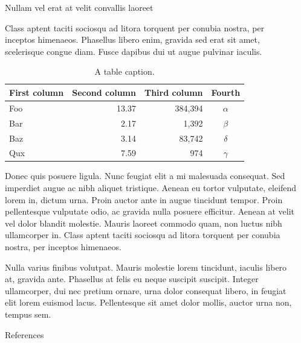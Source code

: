 \documentclass[final]{beamer}
\newlength{\sepwidth}
\newlength{\colwidth}
\newcommand{\separatorcolumn}{\begin{column}{\sepwidth}\end{column}}
\begin{document}
\begin{frame}[t]
\begin{columns}[t]
\begin{column}{\colwidth}
  \begin{block}{Nullam vel erat at velit convallis laoreet}

    Class aptent taciti sociosqu ad litora torquent per conubia nostra, per
    inceptos himenaeos. Phasellus libero enim, gravida sed erat sit amet,
    scelerisque congue diam. Fusce dapibus dui ut augue pulvinar iaculis.

    \begin{table}
      \centering
      \begin{tabular}{l r r c}
        \toprule
        \textbf{First column} & \textbf{Second column} & \textbf{Third column} & \textbf{Fourth} \\
        \midrule
        Foo & 13.37 & 384,394 & $\alpha$ \\
        Bar & 2.17 & 1,392 & $\beta$ \\
        Baz & 3.14 & 83,742 & $\delta$ \\
        Qux & 7.59 & 974 & $\gamma$ \\
        \bottomrule
      \end{tabular}
      \caption{A table caption.}
    \end{table}

    Donec quis posuere ligula. Nunc feugiat elit a mi malesuada consequat. Sed
    imperdiet augue ac nibh aliquet tristique. Aenean eu tortor vulputate,
    eleifend lorem in, dictum urna. Proin auctor ante in augue tincidunt
    tempor. Proin pellentesque vulputate odio, ac gravida nulla posuere
    efficitur. Aenean at velit vel dolor blandit molestie. Mauris laoreet
    commodo quam, non luctus nibh ullamcorper in. Class aptent taciti sociosqu
    ad litora torquent per conubia nostra, per inceptos himenaeos.

    Nulla varius finibus volutpat. Mauris molestie lorem tincidunt, iaculis
    libero at, gravida ante. Phasellus at felis eu neque suscipit suscipit.
    Integer ullamcorper, dui nec pretium ornare, urna dolor consequat libero,
    in feugiat elit lorem euismod lacus. Pellentesque sit amet dolor mollis,
    auctor urna non, tempus sem.

  \end{block}

  \begin{block}{References}

    \nocite{*}
    \footnotesize{}

  \end{block}

\end{column}

\separatorcolumn
\end{columns}
\end{frame}
\end{document}
